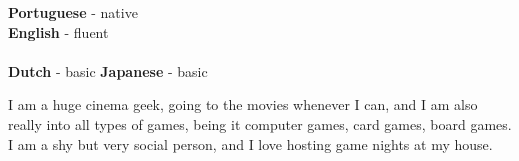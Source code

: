 \documentclass[9pt]{developercv} %
\begin{document}

\begin{minipage}[t]{0.3\textwidth}
	\vspace{-\baselineskip} %

	
	\textbf{Portuguese} - native\\
	\textbf{English} - fluent\\\\
    \textbf{Dutch} - basic
	\textbf{Japanese} - basic
\end{minipage}
\hfill
\begin{minipage}[t]{0.7\textwidth}
	\vspace{-\baselineskip} %
	

	I am a huge cinema geek, going to the movies whenever I can, and I am also really into all
	types of games, being it computer games, card games, board games. 
    I am a shy but very social person, and I love hosting game nights at my house.
\end{minipage}


\end{document}
